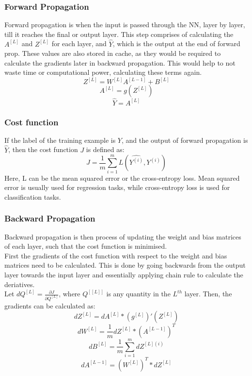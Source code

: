 \documentclass[12pt]{article}
\begin{document}
\subsubsection{Forward Propagation}
Forward propagation is when the input is passed through the NN, layer by layer, till it reaches the final or output layer. This step comprises of calculating the $A^{[L]}$ and $Z^{[L]}$ for each layer, and $\hat{Y}$, which is the output at the end of forward prop. These values are also stored in cache, as they would be required to calculate the gradients later in backward propagation. This would help to not waste time or computational power, calculating these terms again.\\
\begin{equation}
    Z^{[L]} = W^{[L]}A^{[L-1]} + B^{[L]}
\end{equation}
\begin{equation}
    A^{[L]} = g(Z^{[L]})
\end{equation}
\begin{equation}
    \hat{Y} = A^{[L]}
\end{equation}
\newpage
\subsubsection{Cost function}
If the label of the training example is $Y$, and the output of forward propagation is $\hat{Y}$, then the cost function $J$ is defined as:
\begin{equation}
    J = \frac{1}{m} \sum_{i=1}^{m} L(\hat{Y^{(i)}},Y^{(i)})
\end{equation}
Here, L can be the mean squared error or the cross-entropy loss. Mean squared error is usually used for regression tasks, while cross-entropy loss is used for classification tasks. 
\subsubsection{Backward Propagation}
Backward propagation is then process of updating the weight and bias matrices of each layer, such that the cost function is minimised.\\
First the gradients of the cost function with respect to the weight and bias matrices need to be calculated. This is done by going backwards from the output layer towards the input layer and essentially applying chain rule to calculate the deriatives.\\
Let $dQ^{[L]} = \frac{\partial J}{\partial Q^{[L]}}$, where $Q^{[[L]]}$ is any quantity in the $L^{th}$ layer. Then, the gradients can be calculated as:
\begin{equation}
    dZ^{[L]} = dA^{[L]} * (g^{[L]})'(Z^{[L]})
\end{equation}
\begin{equation}
    dW^{[L]} = \frac{1}{m} dZ^{[L]}*(A^{[L-1]})^T
\end{equation}
\begin{equation}
    dB^{[L]} = \frac{1}{m} \sum_{i=1}^{m} dZ^{[L](i)}
\end{equation}
\begin{equation}
    dA^{[L-1]} = (W^{[L]})^T*dZ^{[L]}
\end{equation}
\end{document}
